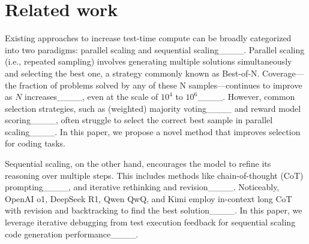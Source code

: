 \section{Related work}
Existing approaches to increase test-time compute can be broadly categorized into two paradigms: parallel scaling and sequential scaling____. 
Parallel scaling (i.e., repeated sampling) involves generating multiple solutions simultaneously and selecting the best one, a strategy commonly known as Best-of-N.
Coverage---the fraction of problems solved by any of these N samples---continues to improve as $N$ increases____, even at the scale of $10^4$ to $10^6$____. 
However, common selection strategies, such as (weighted) majority voting____ and reward model scoring____, often struggle to select the correct best sample in parallel scaling____. In this paper, we propose a novel method that improves selection for coding tasks. 

Sequential scaling, on the other hand, encourages the model to refine its reasoning over multiple steps. This includes methods like chain-of-thought (CoT) prompting____, and iterative rethinking and revision____. Noticeably, OpenAI o1, DeepSeek R1, Qwen QwQ, and Kimi employ in-context long CoT with revision and backtracking to find the best solution____. In this paper, we leverage iterative debugging from test execution feedback for sequential scaling code generation performance____.




